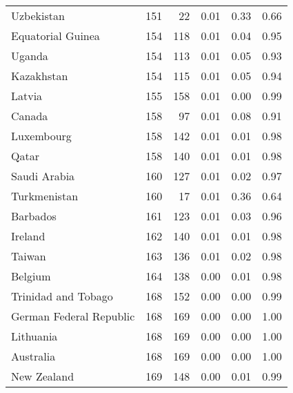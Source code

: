 \begin{longtable}[t]{lrrrrr}
\addlinespace
Uzbekistan & 151 & 22 & 0.01 & 0.33 & 0.66\\
Equatorial Guinea & 154 & 118 & 0.01 & 0.04 & 0.95\\
Uganda & 154 & 113 & 0.01 & 0.05 & 0.93\\
Kazakhstan & 154 & 115 & 0.01 & 0.05 & 0.94\\
Latvia & 155 & 158 & 0.01 & 0.00 & 0.99\\
\addlinespace
Canada & 158 & 97 & 0.01 & 0.08 & 0.91\\
Luxembourg & 158 & 142 & 0.01 & 0.01 & 0.98\\
Qatar & 158 & 140 & 0.01 & 0.01 & 0.98\\
Saudi Arabia & 160 & 127 & 0.01 & 0.02 & 0.97\\
Turkmenistan & 160 & 17 & 0.01 & 0.36 & 0.64\\
\addlinespace
Barbados & 161 & 123 & 0.01 & 0.03 & 0.96\\
Ireland & 162 & 140 & 0.01 & 0.01 & 0.98\\
Taiwan & 163 & 136 & 0.01 & 0.02 & 0.98\\
Belgium & 164 & 138 & 0.00 & 0.01 & 0.98\\
Trinidad and Tobago & 168 & 152 & 0.00 & 0.00 & 0.99\\
\addlinespace
German Federal Republic & 168 & 169 & 0.00 & 0.00 & 1.00\\
Lithuania & 168 & 169 & 0.00 & 0.00 & 1.00\\
Australia & 168 & 169 & 0.00 & 0.00 & 1.00\\
New Zealand & 169 & 148 & 0.00 & 0.01 & 0.99\\
\bottomrule
\end{longtable}
